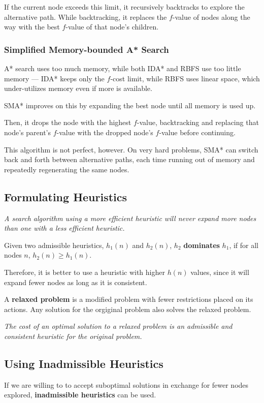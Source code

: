         If the current node exceeds this limit, it recursively backtracks to explore the alternative path. While backtracking, it replaces the $f$-value of nodes along the way with the best $f$-value of that node's children.

        \subsubsection{Simplified Memory-bounded A* Search}
        A* search uses too much memory, while both IDA* and RBFS use too little memory --- IDA* keeps only the $f$-cost limit, while RBFS uses linear space, which under-utilizes memory even if more is available.

        SMA* improves on this by expanding the best node until all memory is used up.

        Then, it drops the node with the highest $f$-value, backtracking and replacing that node's parent's $f$-value with the dropped node's $f$-value before continuing.

        This algorithm is not perfect, however. On very hard problems, SMA* can switch back and forth between alternative paths, each time running out of memory and repeatedly regenerating the same nodes.

    \subsection{Formulating Heuristics}
        \emph{A search algorithm using a more efficient heuristic will never expand more nodes than one with a less efficient heuristic.}

        Given two admissible heuristics, $h_1(n)$ and $h_2(n)$, $h_2$ \textbf{dominates} $h_1$, if for all nodes $n$, $h_2(n) \ge h_1(n)$.

        Therefore, it is better to use a heuristic with higher $h(n)$ values, since it will expand fewer nodes as long as it is consistent.

        A \textbf{relaxed problem} is a modified problem with fewer restrictions placed on its actions. Any solution for the orgiginal problem also solves the relaxed problem.

        \emph{The cost of an optimal solution to a relaxed problem is an admissible and consistent heuristic for the original problem.}

    \subsection{Using Inadmissible Heuristics}
        If we are willing to to accept suboptimal solutions in exchange for fewer nodes explored, \textbf{inadmissible heuristics} can be used.

